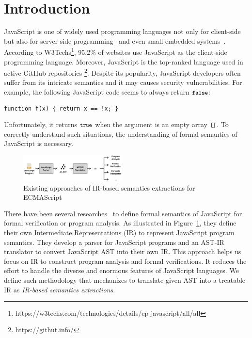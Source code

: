 \section{Introduction}

JavaScript is one of widely used programming languages not only for client-side
but also for server-side programming~\cite{nodejs, meanjs}
and even small embedded systems~\cite{espruino, tessel2}.
According to W3Techs\footnote{https://w3techs.com/technologies/details/cp-javascript/all/all},
95.2\% of websites use JavaScript as the client-side programming language.
Moreover, JavaScript is the top-ranked language used in active GitHub repositories
\footnote{https://githut.info/}.
Despite its popularity, JavaScript developers often suffer from its intricate semantics
and it may causes security vulnerabilities. For example, the following JavaScript
code seems to always return \( \texttt{\small false} \):
\begin{lstlisting}[style=myJSstyle]
function f(x) { return x == !x; }
\end{lstlisting}
Unfortunately, it returns \( \texttt{\small true} \) when the argument is an empty array
\( \texttt{\small[]} \). To correctly understand such situations, the understanding of
formal semantics of JavaScript is necessary.

\begin{figure}
  \centering
  \includegraphics[width=0.48\textwidth]{img/existing.png}
  \caption{Existing approaches of IR-based semantics extractions for ECMAScript}
  \label{fig:existing}
\end{figure}

There have been several researches~\cite{lambdajs, kjs, javert} to define formal semantics of JavaScript
for formal verification or program analysis. As illustrated in Figure~\ref{fig:existing},
they define their own Intermediate Representations (IR) to represent JavaScript
program semantics. They develop a parser for JavaScript programs and
an AST-IR translator to convert JavaScript AST into their own IR.
This approach helps us focus on IR to construct program analysis and formal verifications.
It reduces the effort to handle the diverse and enormous features of JavaScript languages.
We define such methodology that mechanizes to translate given AST into a treatable IR
as \textit{IR-based semantics extractions}.

